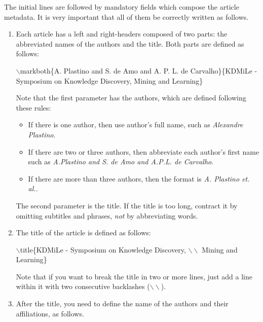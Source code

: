\documentclass[kdmile,a4paper]{kdmile} %
\newenvironment{latexcode}
{\ttfamily\vspace{0.1in}\setlength{\parindent}{18pt}}
{\vspace{0.1in}}
\begin{document}

The initial lines are followed by mandatory fields which compose the article metadata. It is very important that all of them be correctly written as follows.

\begin{enumerate}

	\item Each article has a left and right-headers composed of two parts: the abbreviated names of the authors and the title. Both parts are defined as follows:
	
		\begin{latexcode} 
			$\backslash$markboth\{A. Plastino and S. de Amo and A. P. L. de Carvalho\}\{KDMiLe - Symposium on Knowledge Discovery,  Mining and Learning\} 
		\end{latexcode}
	
		Note that the first parameter has the authors, which are defined following these rules:
		
\begin{itemize}
	\item If there is one author, then use author's full name, such as \textit{Alexandre Plastino}.
	\item If there are two or three authors, then abbreviate each author's first name such as \textit{A.Plastino and S. de Amo and A.P.L. de Carvalho}.
	\item If there are more than three authors, then the format is \textit{A. Plastino et. al.}.
\end{itemize}
	
	The second parameter is the title. If the title is too long, contract it by omitting subtitles and phrases, \textit{not} by abbreviating words.
	
	\item The title of the article is defined as follows:
	
		\begin{latexcode}
				$\backslash$title\{KDMiLe - Symposium on Knowledge Discovery,  $\backslash\backslash$ Mining and Learning\}
		\end{latexcode}
	
		Note that if you want to break the title in two or more lines, just add a line within it with two consecutive backlashes ($\backslash\backslash$).
	
	\item After the title, you need to define the name of the authors and their affiliations, as follows.


\end{enumerate}
\end{document}
